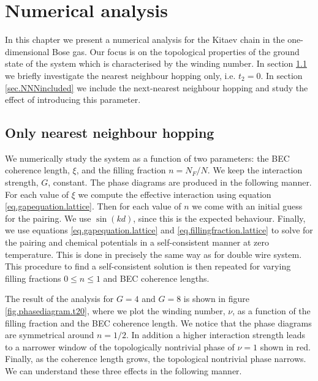 \chapter{Numerical analysis} %

\label{Chapter8} 

In this chapter we present a numerical analysis for the Kitaev chain in the one-dimensional Bose gas. Our focus is on the topological properties of the ground state of the system which is characterised by the winding number. In section \ref{sec.onlyNN} we briefly investigate the nearest neighbour hopping only, i.e. $t_2 = 0$. In section \ref{sec.NNNincluded} we include the next-nearest neighbour hopping and study the effect of introducing this parameter. 
 
\section{Only nearest neighbour hopping} \label{sec.onlyNN}
We numerically study the system as a function of two parameters: the BEC coherence length, $\xi$, and the filling fraction $n = N_F/N$. We keep the interaction strength, $G$, constant. The phase diagrams are produced in the following manner. For each value of $\xi$ we compute the effective interaction using equation \eqref{eq.gapequation.lattice}. Then for each value of $n$ we come with an initial guess for the pairing. We use $\sin(kd)$, since this is the expected behaviour. Finally, we use equations \eqref{eq.gapequation.lattice} and \eqref{eq.fillingfraction.lattice} to solve for the pairing and chemical potentials in a self-consistent manner at zero temperature. This is done in precisely the same way as for double wire system. This procedure to find a self-consistent solution is then repeated for varying filling fractions $0 \leq n \leq 1$ and BEC coherence lengths. 

The result of the analysis for $G = 4$ and $G = 8$ is shown in figure \ref{fig.phasediagram.t20}, where we plot the winding number, $\nu$, as a function of the filling fraction and the BEC coherence length. We notice that the phase diagrams are symmetrical around $n = 1/2$. In addition a higher interaction strength leads to a narrower window of the topologically nontrivial phase of $\nu = 1$ shown in red. Finally, as the coherence length grows, the topological nontrivial phase narrows. We can understand these three effects in the following manner. 

